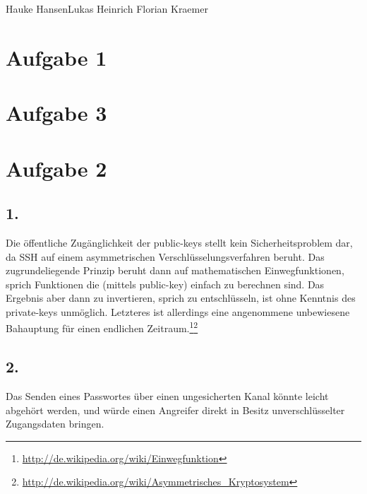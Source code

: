 \documentclass{ti2}
\begin{document}
%
                {Hauke Hansen}{Lukas Heinrich}%
                {Florian Kraemer}{}%

\section*{Aufgabe 1}
\begin{listing}{1}
\end{listing}
\begin{listingcont}

\end{listingcont}

\section*{Aufgabe 3}

\section*{Aufgabe 2}
\subsection*{1.}
Die öffentliche Zugänglichkeit der public-keys stellt kein Sicherheitsproblem dar, da SSH auf einem asymmetrischen Verschlüsselungsverfahren beruht. Das zugrundeliegende Prinzip beruht dann auf mathematischen Einwegfunktionen, sprich Funktionen die (mittels public-key) einfach zu berechnen sind. Das Ergebnis aber dann zu invertieren, sprich zu entschlüsseln, ist ohne Kenntnis des private-keys unmöglich. Letzteres ist allerdings eine angenommene unbewiesene Bahauptung für einen endlichen Zeitraum.\footnote{\url{http://de.wikipedia.org/wiki/Einwegfunktion}}\footnote{\url{http://de.wikipedia.org/wiki/Asymmetrisches_Kryptosystem}}


\subsection*{2.}
Das Senden eines Passwortes über einen ungesicherten Kanal könnte leicht abgehört werden, und würde einen Angreifer direkt in Besitz unverschlüsselter Zugangsdaten bringen.
\end{document}
